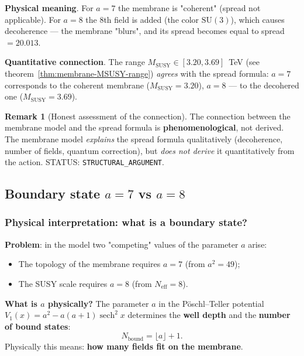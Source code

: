 \documentclass[11pt,a4paper]{article}
\newcommand{\SU}{\ensuremath{\mathrm{SU}}}
\theoremstyle{definition}
\newtheorem{remark}[theorem]{Remark}
\begin{document}
\medskip\noindent
\textbf{Physical meaning}. For $a = 7$ the membrane is "coherent"
(spread not applicable). For $a = 8$ the 8th field is added
(the color $\SU(3)$), which causes decoherence ---
the membrane "blurs", and its spread becomes equal to
spread $= 20.013$.

\medskip\noindent
\textbf{Quantitative connection}. The range
$M_{\text{SUSY}} \in [3.20, 3.69]$~TeV (see theorem~\ref{thm:membrane-MSUSY-range})
\emph{agrees} with the spread formula: $a = 7$
corresponds to the coherent membrane ($M_{\text{SUSY}} = 3.20$),
$a = 8$ --- to the decohered one ($M_{\text{SUSY}} = 3.69$).

\begin{remark}[Honest assessment of the connection]
\label{rem:membrane-spread-honest}
The connection between the membrane model and the spread formula
is \textbf{phenomenological}, not derived.
The membrane model \emph{explains} the spread formula
qualitatively (decoherence, number of fields, quantum correction),
but \emph{does not derive} it quantitatively from the action.
STATUS: \texttt{STRUCTURAL\_ARGUMENT}.
\end{remark}                                  
\subsection{Boundary state \texorpdfstring{$a = 7$}{a = 7} vs \texorpdfstring{$a = 8$}{a = 8}}
\label{subsec:membrane-boundary}
\subsubsection{Physical interpretation: what is a boundary state?}
\label{subsubsec:boundary-interpretation}

\textbf{Problem}: in the model two "competing"
values of the parameter $a$ arise:
\begin{itemize}
    \item The topology of the membrane requires $a = 7$ (from $a^2 = 49$);
    \item The SUSY scale requires $a = 8$ (from $N_{\text{eff}} = 8$).
\end{itemize}

\medskip\noindent
\textbf{What is $a$ physically?}
The parameter $a$ in the P\"oschl--Teller potential
$V_1(x) = a^2 - a(a+1)\operatorname{sech}^2 x$
determines the \textbf{well depth} and the \textbf{number of bound states}:
\begin{equation}
    N_{\text{bound}} = \lfloor a \rfloor + 1.
\end{equation}
Physically this means: \textbf{how many fields fit on the membrane}.
\end{document}
